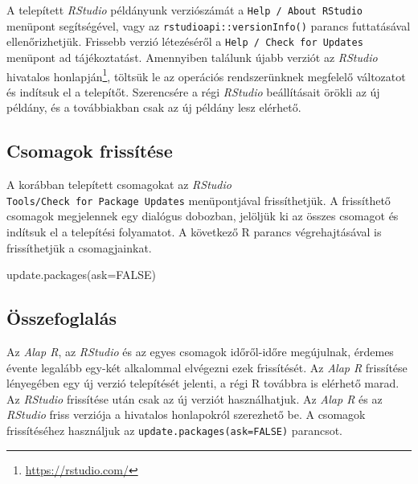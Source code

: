 \documentclass[
]{book}
\makeatletter
\newenvironment{Shaded}{\begin{snugshade}}{\end{snugshade}}
\newcommand{\AttributeTok}[1]{\textcolor[rgb]{0.77,0.63,0.00}{#1}}
\newcommand{\ConstantTok}[1]{\textcolor[rgb]{0.00,0.00,0.00}{#1}}
\newcommand{\FunctionTok}[1]{\textcolor[rgb]{0.00,0.00,0.00}{#1}}
\newcommand{\NormalTok}[1]{#1}
\DeclareRobustCommand{\href}[2]{#2\footnote{\url{#1}}}
\renewcommand{\href}[2]{#2\footnote{\url{#1}}}
\newenvironment{kframe}{%
\medskip{}
\setlength{\fboxsep}{.8em}
 \def\at@end@of@kframe{}%
 \ifinner\ifhmode%
  \def\at@end@of@kframe{\end{minipage}}%
  \begin{minipage}{\columnwidth}%
 \fi\fi%
 \def\FrameCommand##1{\hskip\@totalleftmargin \hskip-\fboxsep
 \colorbox{shadecolor}{##1}\hskip-\fboxsep
     \hskip-\linewidth \hskip-\@totalleftmargin \hskip\columnwidth}%
 \MakeFramed {\advance\hsize-\width
   \@totalleftmargin\z@ \linewidth\hsize
   \@setminipage}}%
 {\par\unskip\endMakeFramed%
 \at@end@of@kframe}
\newenvironment{rmdblock}[1]
  {
  \begin{itemize}
  \renewcommand{\labelitemi}{
    \raisebox{-.7\height}[0pt][0pt]{
      {\setkeys{Gin}{width=3em,keepaspectratio}\texttt{[image: images/\#1]}}
    }
  }
  \setlength{\fboxsep}{1em}
  \begin{kframe}
  \item
  }
  {
  \end{kframe}
  \end{itemize}
  }
\newenvironment{rmdsummary}
  {\begin{rmdblock}{summary}}
  {\end{rmdblock}}
\makeatother
\begin{document}
A telepített \emph{RStudio} példányunk verziószámát a \texttt{Help\ /\ About\ RStudio} menüpont segítségével, vagy az \texttt{rstudioapi::versionInfo()} parancs futtatásával ellenőrizhetjük. Frissebb verzió létezéséről a \texttt{Help\ /\ Check\ for\ Updates} menüpont ad tájékoztatást. Amennyiben találunk újabb verziót az \emph{RStudio} hivatalos \href{https://rstudio.com/}{honlapján}, töltsük le az operációs rendszerünknek megfelelő változatot és indítsuk el a telepítőt. Szerencsére a régi \emph{RStudio} beállításait örökli az új példány, és a továbbiakban csak az új példány lesz elérhető.

\hypertarget{csomagok-frissuxedtuxe9se}{%
\subsection{Csomagok frissítése}\label{csomagok-frissuxedtuxe9se}}

A korábban telepített csomagokat az \emph{RStudio} \texttt{Tools/Check\ for\ Package\ Updates} menüpontjával frissíthetjük. A frissíthető csomagok megjelennek egy dialógus dobozban, jelöljük ki az összes csomagot és indítsuk el a telepítési folyamatot. A következő R parancs végrehajtásával is frissíthetjük a csomagjainkat.

\begin{Shaded}
\begin{Highlighting}[]
\FunctionTok{update.packages}\NormalTok{(}\AttributeTok{ask=}\ConstantTok{FALSE}\NormalTok{) }
\end{Highlighting}
\end{Shaded}

\hypertarget{az-r-telepitese-3-summary}{%
\subsection{Összefoglalás}\label{az-r-telepitese-3-summary}}

\begin{rmdsummary}
Az \emph{Alap R}, az \emph{RStudio} és az egyes csomagok időről-időre
megújulnak, érdemes évente legalább egy-két alkalommal elvégezni ezek
frissítését. Az \emph{Alap R} frissítése lényegében egy új verzió
telepítését jelenti, a régi R továbbra is elérhető marad. Az
\emph{RStudio} frissítése után csak az új verziót használhatjuk. Az
\emph{Alap R} és az \emph{RStudio} friss verziója a hivatalos
honlapokról szerezhető be. A csomagok frissítéséhez használjuk az
\texttt{update.packages(ask=FALSE)} parancsot.
\end{rmdsummary}
\end{document}
